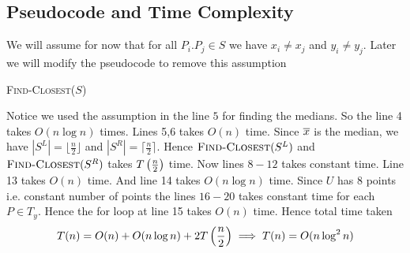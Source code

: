 \subsection{Pseudocode and Time Complexity}
\begin{assumption*}
	We will assume for now that for all $P_i.P_j\in S$ we have $x_i\neq x_j$ and $y_i\neq y_j$. Later we will modify the pseudocode to remove this assumption
\end{assumption*}
\begin{algorithm}
	\DontPrintSemicolon

	\caption{\textsc{Find-Closest}($S$)}
	\label{find-closest-nlog2n}	
\end{algorithm}

Notice we used the assumption in the line $5$ for finding the medians. So the line 4 takes $O(n\log n)$ times. Lines 5,6 takes $O(n)$ time. Since $\overline{x}$ is the median, we have  $|S^L|=\lfloor \frac{n}2\rfloor$ and $|S^R|=\lceil \frac{n}{2}\rceil$. Hence $\textsc{Find-Closest}(S^L)$ and $\textsc{Find-Closest}(S^R)$ takes $T\left(\frac{n}{2}\right)$ time. Now lines $8-12$ takes constant time. Line 13 takes $O(n)$ time. And line 14 takes $O(n\log n)$ time. Since $U$ has 8 points i.e. constant number of points the lines $16-20$ takes constant time for each $P\in T_y$. Hence the for loop at line 15 takes $O(n)$ time. Hence total time taken $$T(n)=O(n)+O(n\log n)+2T\left(\frac{n}2\right)\implies T(n)=O(n\log^2n)$$
